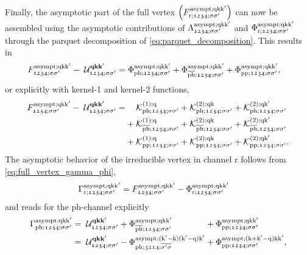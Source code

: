 \documentclass[\main/main.tex]{subfiles}
\begin{document}
Finally, the asymptotic part of the full vertex $\left (F_{\text{r};\mathfrak{1234};\sigma\sigma'}^{\text{asympt};\text{q}\text{k}\text{k}'}\right )$ can now be assembled using the asymptotic contributions of $\Lambda^{\text{asympt};\text{q}\text{k}\text{k}'}_{\mathfrak{1234};\sigma\sigma'}$ and $\Phi_{\text{r};\mathfrak{1234};\sigma\sigma'}^{\text{asympt};\text{q}\text{k}\text{k}'}$ through the parquet decomposition of \eqref{eq:parquet_decomposition}. This results in
\begin{align}
\begin{split}
	F_{\mathfrak{1234};\sigma\sigma'}^{\text{asympt};\text{q}\text{k}\text{k}'}-\;\mathcal{U}^{\textbf{qkk}'}_{\mathfrak{1234};\sigma\sigma'}&=\Phi_{\text{ph};\mathfrak{1234};\sigma\sigma'}^{\text{asympt};\text{q}\text{k}\text{k}'}+\Phi_{\overline{\text{ph}};\mathfrak{1234};\sigma\sigma'}^{\text{asympt};\text{q}\text{k}\text{k}'}+\Phi_{\text{pp};\mathfrak{1234};\sigma\sigma'}^{\text{asympt};\text{q}\text{k}\text{k}'},
\end{split}
\end{align}
or explicitly with kernel-1 and kernel-2 functions,
\begin{equation}
\begin{alignedat}{4}
	F_{\mathfrak{1234};\sigma\sigma'}^{\text{asympt};\text{q}\text{k}\text{k}'}-\;\mathcal{U}^{\textbf{qkk}'}_{\mathfrak{1234};\sigma\sigma'}=&\phantom{+}\;\,\mathcal{K}^{(1);\text{q}}_{\text{ph};\mathfrak{1234};\sigma\sigma'} &&+ \mathcal{K}^{(2);\text{q}\text{k}}_{\text{ph};\mathfrak{1234};\sigma\sigma'}&&+\mathcal{K}^{(2);\text{q}\text{k}'}_{\text{ph};\mathfrak{1234};\sigma\sigma'}\\
	&+\mathcal{K}^{(1);\text{q}}_{\overline{\text{ph}};\mathfrak{1234};\sigma\sigma'} &&+ \mathcal{K}^{(2);\text{q}\text{k}}_{\overline{\text{ph}};\mathfrak{1234};\sigma\sigma'}&&+\mathcal{K}^{(2);\text{q}\text{k}'}_{\overline{\text{ph}};\mathfrak{1234};\sigma\sigma'}\\
	&+\mathcal{K}^{(1);\text{q}}_{\text{pp};\mathfrak{1234};\sigma\sigma'} &&+ \mathcal{K}^{(2);\text{q}\text{k}}_{\text{pp};\mathfrak{1234};\sigma\sigma'}&&+\mathcal{K}^{(2);\text{q}\text{k}'}_{\text{pp};\mathfrak{1234};\sigma\sigma'}.
\end{alignedat}
\end{equation}
The asymptotic behavior of the irreducible vertex in channel r follows from \eqref{eq:full_vertex_gamma_phi},
\begin{align}
	\Gamma_{\text{r};\mathfrak{1234};\sigma\sigma'}^{\text{asympt};\text{q}\text{k}\text{k}'}&=F_{\mathfrak{1234};\sigma\sigma'}^{\text{asympt};\text{q}\text{k}\text{k}'}-\Phi_{\text{r};\mathfrak{1234};\sigma\sigma'}^{\text{asympt};\text{q}\text{k}\text{k}'}
\end{align}
and reads for the ph-channel explicitly
\begin{equation}
\begin{alignedat}{3}
	\Gamma_{\text{ph};\mathfrak{1234};\sigma\sigma'}^{\text{asympt};\text{q}\text{k}\text{k}'}&=\;\mathcal{U}^{\textbf{qkk}'}_{\mathfrak{1234};\sigma\sigma'}&&+\Phi_{\overline{\text{ph}};\mathfrak{1234};\sigma\sigma'}^{\text{asympt};\text{q}\text{k}\text{k}'}&&+\Phi_{\text{pp};\mathfrak{1234};\sigma\sigma'}^{\text{asympt};\text{q}\text{k}\text{k}'}\\
	&=\;\mathcal{U}^{\textbf{qkk}'}_{\mathfrak{1234};\sigma\sigma'}&&-\Phi_{\text{ph};\mathfrak{3214};\overline{\sigma'\sigma}}^{\text{asympt};(\text{k}'-\text{k})(\text{k}'-\text{q})\text{k}'}&&+\Phi_{\text{pp};\mathfrak{1234};\sigma\sigma'}^{\text{asympt};(\text{k}+\text{k}'-\text{q})\text{k}\text{k}'},
\end{alignedat}
\end{equation}
\end{document}

